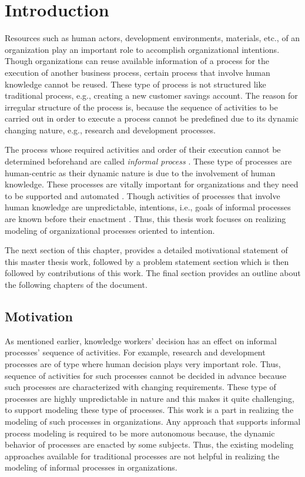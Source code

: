 \chapter{Introduction}
\label{chap:introduction}

Resources such as human actors, development environments, materials, etc., of an organization play an important role to accomplish organizational intentions. Though organizations can reuse available information of a process for the execution of another business process, certain process that involve human knowledge cannot be reused. These type of process is not structured like traditional process, e.g., creating a new customer savings account. The reason for irregular structure of the process is, because the sequence of activities to be carried out in order to execute a process cannot be predefined due to its dynamic changing nature, e.g., research and development processes.

The process whose required activities and order of their execution cannot be determined beforehand are called \textit{informal process} \cite{Sungur2014}. These type of processes are human-centric as their dynamic nature is due to the involvement of human knowledge. These processes are vitally important for organizations and they need to be supported and automated \cite{Sungur2014a}. Though activities of processes that involve human knowledge are unpredictable, intentions, i.e., goals of informal processes are known before their enactment \cite{DiCiccio2015}. Thus, this thesis work focuses on realizing modeling of organizational processes oriented to intention. 

The next section of this chapter, provides a detailed motivational statement of this master thesis work, followed by a problem statement section which is then followed by contributions of this work. The final section provides an outline about the following chapters of the document. 

\section{Motivation}
\label{sec:motivation}
As mentioned earlier, knowledge workers' decision has an effect on informal processes' sequence of activities. For example, research and development processes are of type where human decision plays very important role. Thus, sequence of activities for such processes cannot be decided in advance because such processes are characterized with changing requirements. These type of processes are highly unpredictable in nature and this makes it quite challenging, to support modeling these type of processes. This work is a part in realizing the modeling of such processes in organizations. Any approach that supports informal process modeling is required to be more autonomous because, the dynamic behavior of processes are enacted by some subjects. Thus, the existing modeling approaches available for traditional processes are not helpful in realizing the modeling of informal processes in organizations.  

